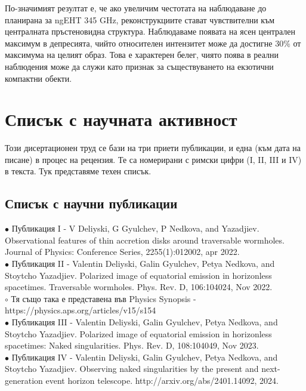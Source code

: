 По-значимият резултат е, че ако увеличим честотата на наблюдаване до планирана за ngEHT 345 GHz, реконструкциите стават чувствителни към централната пръстеновидна структура. Наблюдаваме появата на ясен централен максимум в депресията, чийто относителен интензитет може да достигне 30\% от максимума на целият образ. Това е характерен белег, чиято поява в реални наблюдения може да служи като признак за съществуването на екзотични компактни обекти.

\newpage

\section{Списък с научната активност}

Този дисертационен труд се бази на три приети публикации, и една (към дата на писане) в процес на рецензия. Те са номерирани с римски цифри (I, II, III и IV) в текста. Тук представяме техен списък.

\subsection{Списък с научни публикации}

$\bullet$ Публикация I - V Deliyski, G Gyulchev, P Nedkova, and Yazadjiev. Observational features of thin accretion disks around traversable wormholes. Journal of Physics: Conference Series, 2255(1):012002, apr 2022.\\

\noindent$\bullet$ Публикация II - Valentin Deliyski, Galin Gyulchev, Petya Nedkova, and Stoytcho Yazadjiev. Polarized image of equatorial emission in horizonless spacetimes. Traversable wormholes. Phys. Rev. D, 106:104024, Nov 2022.\\

\indent$\circ$ Тя също така е представена във Physics Synopsis - \\\indent https://physics.aps.org/articles/v15/s154\\

\noindent$\bullet$ Публикация III - Valentin Deliyski, Galin Gyulchev, Petya Nedkova, and Stoytcho Yazadjiev. Polarized image of equatorial emission in horizonless spacetimes: Naked singularities. Phys. Rev. D, 108:104049, Nov 2023.\\

\noindent$\bullet$ Публикация IV - Valentin Deliyski, Galin Gyulchev, Petya Nedkova, and Stoytcho Yazadjiev. Observing naked singularities by the present and next-generation event horizon telescope. http://arxiv.org/abs/2401.14092, 2024.

